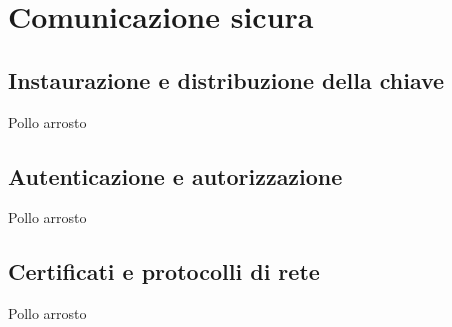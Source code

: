
\chapter{Comunicazione sicura}

    \bigskip
    \section{Instaurazione e distribuzione della chiave}
        Pollo arrosto

    \bigskip
    \section{Autenticazione e autorizzazione}
        Pollo arrosto

    \bigskip
    \section{Certificati e protocolli di rete}
        Pollo arrosto
